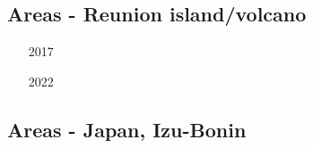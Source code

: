 \subsection{Areas - Reunion island/volcano}


\begin{scriptsize}
\begin{itemize}
\item[2017]
\textcite{brsg17} 
\item[2022]
\textcite{gefp22} 
\end{itemize}
\end{scriptsize}



\subsection{Areas - Japan, Izu-Bonin} 


